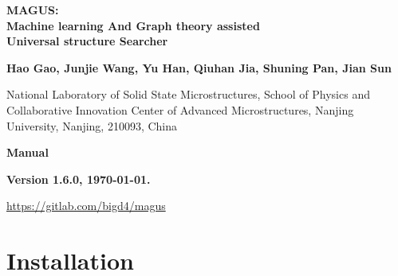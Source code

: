 \documentclass[12pt,oneside]{book}
\begin{document}

\begin{titlepage}

\begin{center}

\vspace{2.0cm}

\textbf{ 
\Large MAGUS: \vspace{0.7cm} \\
Machine learning And Graph theory assisted \vspace{0.5cm} \\
Universal structure Searcher}
\vspace{1.5cm}

\textbf{Hao Gao, Junjie Wang, Yu Han, Qiuhan Jia, Shuning Pan, Jian Sun}

\vspace{0.5cm}

National Laboratory of Solid State Microstructures,
School of Physics and Collaborative Innovation Center of Advanced Microstructures, Nanjing University, Nanjing, 210093, China

\vspace{0.5cm}

\vspace{2.0cm}

\textbf{\Large Manual}

\textbf{Version 1.6.0, \today.}

\vspace{2.0cm}

\textcolor{blue}{\url{https://gitlab.com/bigd4/magus}}

\end{center}

\vspace{1.0cm}

\end{titlepage}


\newpage
\setcounter{tocdepth}{4}
\tableofcontents

\newpage
\chapter{Installation}
\end{document}
